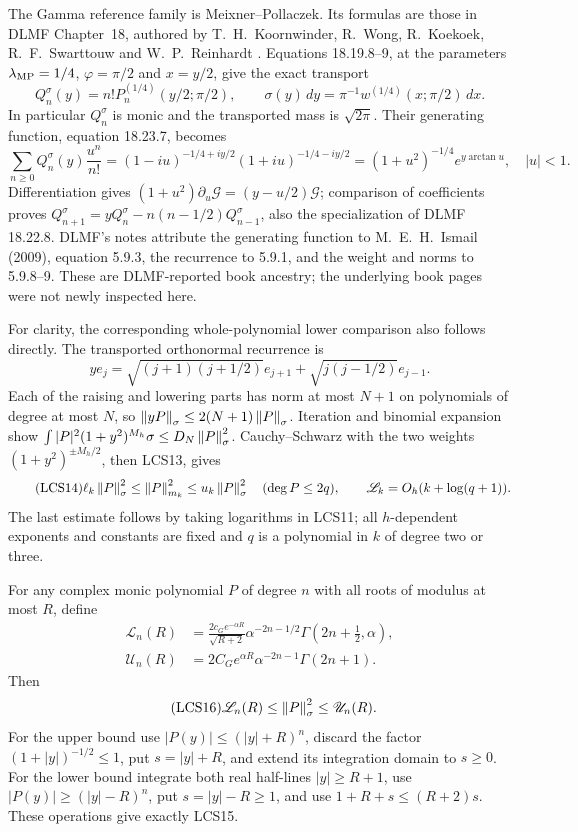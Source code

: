 The Gamma reference family is Meixner--Pollaczek. Its formulas
are those in DLMF Chapter~18, authored by T.~H.~Koornwinder,
R.~Wong, R.~Koekoek, R.~F.~Swarttouw and W.~P.~Reinhardt
\cite{a04lcs:dlmf18}. Equations 18.19.8--9, at the parameters
$\lambda_{\rm MP}=1/4$, $\varphi=\pi/2$ and $x=y/2$, give the
exact transport
\[
 Q_n^\sigma(y)=n!P_n^{(1/4)}(y/2;\pi/2),\qquad
 \sigma(y)\,dy=\pi^{-1}w^{(1/4)}(x;\pi/2)\,dx.
\]
In particular $Q_n^\sigma$ is monic and the transported mass is
$\sqrt{2\pi}$. Their generating function, equation 18.23.7, becomes
\[
 \sum_{n\ge0}Q_n^\sigma(y)\frac{u^n}{n!}
 =(1-iu)^{-1/4+iy/2}(1+iu)^{-1/4-iy/2}
 =(1+u^2)^{-1/4}e^{y\arctan u},\quad |u|<1.
\]
Differentiation gives $(1+u^2)\partial_u\mathcal G=(y-u/2)\mathcal G$;
comparison of coefficients proves
$Q_{n+1}^\sigma=yQ_n^\sigma-n(n-1/2)Q_{n-1}^\sigma$, also the
specialization of DLMF 18.22.8. DLMF's notes attribute the generating
function to M.~E.~H.~Ismail (2009), equation 5.9.3, the recurrence
to 5.9.1, and the weight and norms to 5.9.8--9. These are
DLMF-reported book ancestry; the underlying book pages were not
newly inspected here.

For clarity, the corresponding whole-polynomial lower comparison
also follows directly. The transported orthonormal recurrence is
\[
 ye_j=\sqrt{(j+1)(j+1/2)}e_{j+1}
           +\sqrt{j(j-1/2)}e_{j-1}.
\]
Each of the raising and lowering parts has norm at most $N+1$
on polynomials of degree at most $N$, so
$\left\lVert yP\right\rVert_\sigma\le2(N+1)\left\lVert P\right\rVert_\sigma$.
Iteration and binomial expansion show
$\int|P|^2(1+y^2)^{M_h}\sigma\le D_N\left\lVert P\right\rVert_\sigma^2$.
Cauchy--Schwarz with the two weights $(1+y^2)^{\pm M_h/2}$,
then LCS13, gives
\begin{equation}\tag{LCS14}
 \ell_k\left\lVert P\right\rVert_\sigma^2\le\left\lVert P\right\rVert_{m_k}^2
       \le u_k\left\lVert P\right\rVert_\sigma^2\quad(\deg P\le2q),\qquad
 \mathscr L_k=O_h(k+\log(q+1)).
\end{equation}
The last estimate follows by taking logarithms in LCS11; all
$h$-dependent exponents and constants are fixed and $q$ is a
polynomial in $k$ of degree two or three.

For any complex monic polynomial $P$ of degree $n$ with all roots
of modulus at most $R$, define
\begin{equation}\tag{LCS15}
\begin{aligned}
 \mathscr L_n(R)&=
 \frac{2c_Ge^{-\alpha R}}{\sqrt{R+2}}
       \alpha^{-2n-1/2}\Gamma(2n+\tfrac12,\alpha),\\
 \mathscr U_n(R)&=2C_Ge^{\alpha R}
       \alpha^{-2n-1}\Gamma(2n+1).
\end{aligned}
\end{equation}
Then
\begin{equation}\tag{LCS16}
 \mathscr L_n(R)\le\left\lVert P\right\rVert_\sigma^2\le\mathscr U_n(R).
\end{equation}
For the upper bound use $|P(y)|\le(|y|+R)^n$, discard the
factor $(1+|y|)^{-1/2}\le1$, put $s=|y|+R$, and extend its
integration domain to $s\ge0$. For the lower bound integrate
both real half-lines $|y|\ge R+1$, use
$|P(y)|\ge(|y|-R)^n$, put $s=|y|-R\ge1$, and use
$1+R+s\le(R+2)s$. These operations give exactly LCS15.

